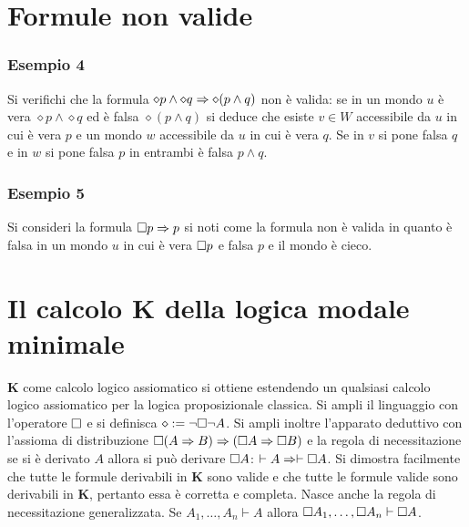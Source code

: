 \section{Formule non valide}
\subsubsection{Esempio 4}
Si verifichi che la formula $\diamond p\land \diamond q\Rightarrow\diamond(p\land q)$ non \`e valida: se in un mondo $u$ \`e vera $\diamond p\land\diamond q$ ed \`e falsa $\diamond(p\land q)$ si deduce che
esiste $v\in W$ accessibile da $u$ in cui \`e vera $p$ e un mondo $w$ accessibile da $u$ in cui \`e vera $q$. Se in $v$ si pone falsa $q$ e in $w$ si pone falsa $p$ in entrambi \`e falsa $p\land q$.
\subsubsection{Esempio 5}
Si consideri la formula $\Box p\Rightarrow p$ si noti come la formula non \`e valida in quanto \`e falsa in un mondo $u$ in cui \`e vera $\Box p$ e falsa $p$ e il mondo \`e cieco. 
\section{Il calcolo \textbf{K} della logica modale minimale}
\textbf{K} come calcolo logico assiomatico si ottiene estendendo un qualsiasi calcolo logico assiomatico per la logica proposizionale classica. Si ampli il linguaggio con l'operatore $\Box$ e si definisca $\diamond:=
\neg\Box\neg A$. Si ampli inoltre l'apparato deduttivo con l'assioma di distribuzione $\Box(A\Rightarrow B)\Rightarrow(\Box A\Rightarrow\Box B)$ e la regola di necessitazione se si \`e derivato $A$ allora
si pu\`o derivare $\Box A$:  $\vdash A\Rightarrow\vdash\Box A$. Si dimostra facilmente che tutte le formule derivabili in \textbf{K} sono valide e che tutte le formule valide sono derivabili in \textbf{K}, pertanto 
essa \`e corretta e completa. Nasce anche la regola di necessitazione generalizzata. Se $A_1,\dots, A_n\vdash A$ allora $\Box A_1,\dots,\Box A_n\vdash \Box A$.  